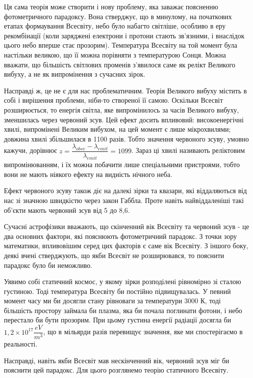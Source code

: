 \documentclass[a4paper]{article}
\begin{document}
Ця сама теорія може створити і нову проблему, яка заважає поясненню фотометричного парадоксу. Вона стверджує, що в минулому, на початкових етапах формаування Всесвіту, небо було набагто світліше, особливо в еру рекомбінації (коли заряджені електрони і протони стають зв'язними, і внаслідок цього небо вперше стає прозорим). Температура Всесвіту на той момент була настільки великою, що її можна порівняти з температурою Сонця. Можна вважати, що більшість світлових променів з'явилося саме як релікт Великого вибуху, а не як випромінення з сучасних зірок.

Насправді ж, це не є для нас проблематичним. Теорія Великого вибуху містить в собі і вирішення проблеми, ніби-то створеної її самою. Оскільки Всесвіт розширюється, то енергія світла, яке випромінилось за часів Великого вибуху, зменшилась через червоний зсув. Цей ефект досить впливовий: високоенергічні хвилі, випромінені Великим вибухом, на цей момент є лише мікрохвилями; довжина хвилі збільшилася в 1100 разів. Тобто значення червоного зсуву, умовно кажучи, дорівнює $z = \dfrac{\lambda_{obsv}-\lambda_{emit}}{\lambda_{emit}} = 1099$. \cite{introduction} Зараз ці хвилі називають реліктовим випромінюванням, і їх можна побачити лише спеціальними пристроями, тобто вони не мають ніякого ефекту на видиість нічного неба.

Ефект червоного зсуву також діє на далекі зірки та квазари, які віддаляються від нас зі значною швидкістю через закон Габбла. Проте навіть найвіддаленіші такі об'єкти мають червоний зсув від 5 до 8,6. \cite{relativityFAQ}

Сучасні астрофізики вважають, що скінченний вік Всесвіту та червоний зсув - це два основних фактори, які пояснюють фотометричний парадокс. З точки зору математики, впливовішим серед цих факторів є саме вік Всесвіту. З іншого боку, деякі вчені стверджують, що якби Всесвіт не розширювався, то пояснити парадокс було би неможливо.

Уявимо собі статичний космос, у якому зірки розподілені рівномірно зі сталою густиною. Тоді температура Всесвіту би постійно підвищувалась. У певний момент часу ми би досягли стану рівноваги за температури 3000 К, тоді більшість простору займала би плазма, яка би почала поглинати фотони, і небо перестало би бути прозорим. При цьому густина енергії радіації досягла би $1,2 \times 10^{17} \dfrac{eV}{m^3}$, що в мільярди разів перевищує значення, яке ми спостерігаємо в реальності. \cite{introduction}

Насправді, навіть якби Всесвіт мав нескінченний вік, червоний зсув міг би пояснити цей парадокс. Для цього розглянемо теорію статичного Всесвіту.
\end{document}
